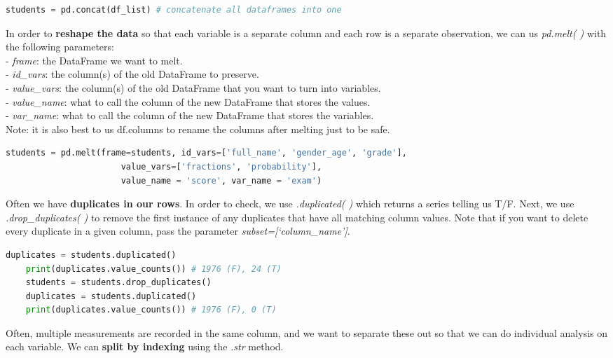 \documentclass[11pt, a4paper]{article}
\begin{document}
\begin{spacing}{1.1}
\begin{lstlisting}[language=Python]
	students = pd.concat(df_list) # concatenate all dataframes into one \end{lstlisting}\vspace*{1mm}
	In order to \textbf{reshape the data} so that each variable is a separate column and each row is a separate observation, we can us \textit{pd.melt( )} with the following parameters: \\
	\hspace*{3mm} - \textit{frame}: the DataFrame we want to melt. \\
	\hspace*{3mm} - \textit{id\_vars}: the column(s) of the old DataFrame to preserve. \\
	\hspace*{3mm} - \textit{value\_vars}: the column(s) of the old DataFrame that you want to turn into variables. \\
	\hspace*{3mm} - \textit{value\_name}: what to call the column of the new DataFrame that stores the values. \\
	\hspace*{3mm} - \textit{var\_name}: what to call the column of the new DataFrame that stores the variables. \\
	Note: it is also best to us df.columns to rename the columns after melting just to be safe. 
	\begin{lstlisting}[language=Python]
	students = pd.melt(frame=students, id_vars=['full_name', 'gender_age', 'grade'], 
	                   value_vars=['fractions', 'probability'], 
	                   value_name = 'score', var_name = 'exam')	\end{lstlisting}\vspace*{1mm}
	Often we have \textbf{duplicates in our rows}. In order to check, we use \textit{.duplicated( )} which returns a series telling us T/F. Next, we use \textit{.drop\_duplicates( )} to remove the first instance of any duplicates that have all matching column values. Note that if you want to delete every duplicate in a given column, pass the parameter \textit{subset=[`column\_name']}.
	\begin{lstlisting}[language=Python]
	duplicates = students.duplicated() 
	print(duplicates.value_counts()) # 1976 (F), 24 (T)
	students = students.drop_duplicates()
	duplicates = students.duplicated()
	print(duplicates.value_counts()) # 1976 (F), 0 (T)	\end{lstlisting}\vspace*{1mm}
	Often, multiple measurements are recorded in the same column, and we want to separate these out so that we can do individual analysis on each variable. We can \textbf{split by indexing} using the \textit{.str} method.

\end{spacing}
\end{document}
